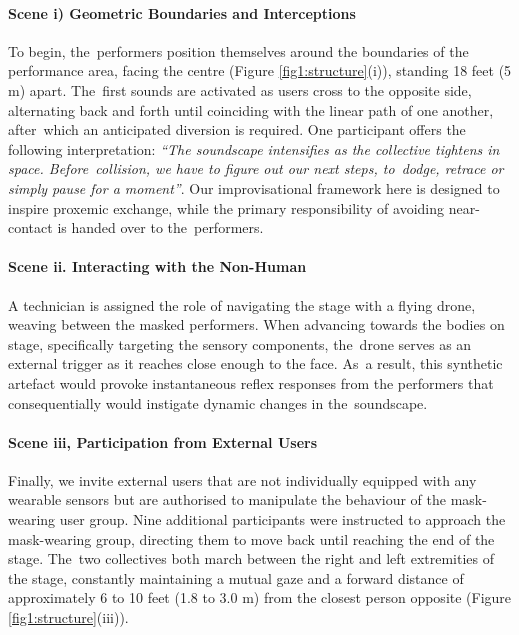 \paragraph{Scene i) Geometric Boundaries and Interceptions}

To begin, the~performers position themselves around the boundaries of the performance area, facing the centre (Figure \ref{fig1:structure}(i)), standing 18 feet (5 m) apart. The~first sounds are activated as users cross to the opposite side, alternating back and forth until coinciding with the linear path of one another, after~which an anticipated diversion is required. One participant offers the following interpretation: \textit{``The soundscape intensifies as the collective tightens in space. Before~collision, we have to figure out our next steps, to~dodge, retrace or simply pause for a moment''}. Our improvisational framework here is designed to inspire proxemic exchange, while the primary responsibility of avoiding near-contact is handed over to the~performers.

\paragraph{Scene ii. Interacting with the Non-Human}

A technician is assigned the role of navigating the stage with a flying drone, weaving between the masked performers. When advancing towards the bodies on stage, specifically targeting the sensory components, the~drone serves as an external trigger as it reaches close enough to the face. As~a result, this synthetic artefact would provoke instantaneous reflex responses from the performers that consequentially would instigate dynamic changes in the~soundscape.

\paragraph{Scene iii, Participation from External Users}

Finally, we invite external users that are not individually equipped with any wearable sensors but are authorised to manipulate the behaviour of the mask-wearing user group. Nine additional participants were instructed to approach the mask-wearing group, directing them to move back until reaching the end of the stage. The~two collectives both march between the right and left extremities of the stage, constantly maintaining a mutual gaze and a forward distance of approximately 6 to 10 feet (1.8 to 3.0 m) from the closest person opposite (Figure \ref{fig1:structure}(iii)).

